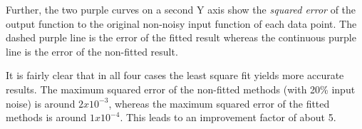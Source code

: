 Further, the two purple  curves  on  a  second  Y  axis show the \textit{squared
error}  of the output function to the original non-noisy input function of  each
data point. The dashed purple line is the error of the fitted result whereas the
continuous purple line is the error of the non-fitted result.

It is fairly clear that in all  four  cases  the  least  square  fit yields more
accurate results. The maximum squared error of the non-fitted methods (with 20\%
input  noise)  is  around $2x10^{-3}$, whereas the maximum squared error of  the
fitted  methods  is  around  $1x10^{-4}$. This leads to an improvement factor of
about 5.

